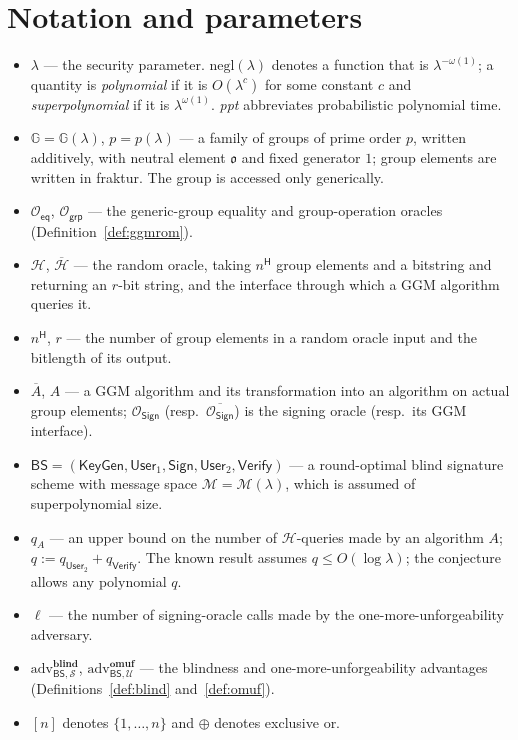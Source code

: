 \documentclass{conjura-conjecture}
\newcommand{\GG}{\mathbb{G}}
\newcommand{\MM}{\mathcal{M}}
\newcommand{\HH}{\mathcal{H}}
\newcommand{\negl}{\mathrm{negl}}
\newcommand{\BS}{\mathsf{BS}}
\newcommand{\KeyGen}{\mathsf{KeyGen}}
\newcommand{\Userone}{\mathsf{User}_1}
\newcommand{\Usertwo}{\mathsf{User}_2}
\newcommand{\Sig}{\mathsf{Sign}}
\newcommand{\Ver}{\mathsf{Verify}}
\newcommand{\Oeq}{\mathcal{O}_{\mathsf{eq}}}
\newcommand{\Ogrp}{\mathcal{O}_{\mathsf{grp}}}
\newcommand{\OSign}{\mathcal{O}_{\mathsf{Sign}}}
\newcommand{\adv}{\mathrm{adv}}
\begin{document}
\section{Notation and parameters}\label{sec:notation}

\begin{itemize}
\item $\lambda$ --- the security parameter. $\negl(\lambda)$ denotes a
  function that is $\lambda^{-\omega(1)}$; a quantity is
  \emph{polynomial} if it is $O(\lambda^{c})$ for some constant $c$ and
  \emph{superpolynomial} if it is $\lambda^{\omega(1)}$. \emph{ppt}
  abbreviates probabilistic polynomial time.
\item $\GG=\GG(\lambda)$, $p=p(\lambda)$ --- a family of groups of prime
  order $p$, written additively, with neutral element $\mathfrak{o}$ and
  fixed generator $\mathfrak{1}$; group elements are written in fraktur.
  The group is accessed only generically.
\item $\Oeq$, $\Ogrp$ --- the generic-group equality and group-operation
  oracles (Definition~\ref{def:ggmrom}).
\item $\HH$, $\overline{\HH}$ --- the random oracle, taking
  $n^{\mathsf{H}}$ group elements and a bitstring and returning an
  $r$-bit string, and the interface through which a GGM algorithm
  queries it.
\item $n^{\mathsf{H}}$, $r$ --- the number of group elements in a random
  oracle input and the bitlength of its output.
\item $\overline{A}$, $A$ --- a GGM algorithm and its transformation
  into an algorithm on actual group elements; $\OSign$ (resp.\
  $\overline{\OSign}$) is the signing oracle (resp.\ its GGM interface).
\item $\BS=(\KeyGen,\Userone,\Sig,\Usertwo,\Ver)$ --- a round-optimal
  blind signature scheme with message space $\MM=\MM(\lambda)$, which is
  assumed of superpolynomial size.
\item $q_{A}$ --- an upper bound on the number of $\HH$-queries made by
  an algorithm $A$; $q:=q_{\Usertwo}+q_{\Ver}$. The known result assumes
  $q\le O(\log\lambda)$; the conjecture allows any polynomial $q$.
\item $\ell$ --- the number of signing-oracle calls made by the
  one-more-unforgeability adversary.
\item $\adv^{\mathbf{blind}}_{\BS,\mathcal{S}}$,
  $\adv^{\mathbf{omuf}}_{\BS,\mathcal{U}}$ --- the blindness and
  one-more-unforgeability advantages
  (Definitions~\ref{def:blind} and~\ref{def:omuf}).
\item $[n]$ denotes $\{1,\dots,n\}$ and $\oplus$ denotes exclusive or.
\end{itemize}
\end{document}
